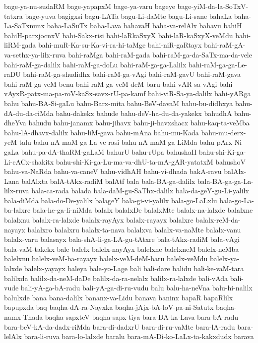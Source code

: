 {bage-ya-nu-sudaRM
bage-yapapxM
bage-ya-varu
bageye
bage-yiM-da-la-SoTxV-tatxra
bage-yuva
bagigxsi
bagu-LATa
bagu-Li-daMte
bagu-Li-sane
bahaLa
baha-La-SaTxnunx
baha-LaSuTx
baha-Lava
bahavaH
baha-va-relAlx
bahavu
bahiH
bahiH-parxjocnxV
bahi-Sakx-risi
bahi-laRkaSxyX
bahi-laR-kaSxyX-veMdu
bahi-liRM-gada
bahi-muR-Ka-su-Ka-vi-ra-hi-taMge
bahi-niR-gaRtayx
bahi-raM-gA-va-sethx-ya-lilx-ruva
bahi-raMga
bahi-raM-gada
bahi-raM-ga-da-SaTx-ma-da-vele
bahi-raM-ga-dalilx
bahi-raM-ga-doLu
bahi-raM-ga-ga-Lalilx
bahi-raM-ga-ga-Le-raDU
bahi-raM-ga-shudidhx
bahi-raM-ga-vAgi
bahi-raM-gavU
bahi-raM-gava
bahi-raM-ga-veM-benu
bahi-raM-ga-veM-deM-baru
bahi-vAR-sa-vAgi
bahi-vAyxR-patx-ma-pa-roV-kaSx-savx-rU-pa-kamf
bahi-viR-Sa-ya-dalilx
bahi-yARga
bahu
bahu-BA-Si-gaLu
bahu-Barx-mita
bahu-BeV-davaM
bahu-bu-didhxya
bahu-dA-du-da-riMda
bahu-dakekx
bahude
bahu-deV-ha-du-da-yakekx
bahudhA
bahu-dheYva
bahudu
bahu-janamx
bahu-jihavx
bahu-ji-havxshacx
bahu-kaq-ta-veMba
bahu-lA-dhavx-dalilx
bahu-liM-gava
bahu-mAna
bahu-mu-Kada
bahu-mu-derx-yeM-talu
bahu-nA-maM-ga-La-ve-rasi
bahu-nA-maM-ga-LiMda
bahu-pArx-Ni-gaLa
bahu-pa-dA-thaRM-gaLaM
bahurU
bahu-rUpa
bahushaH
bahu-shi-Ki-ga-Li-cACx-shakitx
bahu-shi-Ki-ga-Lu-ma-va-dhU-ta-mA-gAR-yatatxM
bahushoV
bahu-va-NaRda
bahu-va-caneV
bahu-vidhAH
bahu-vi-dhada
bakA-ravu
balAlx-Lana
balAlxta
balA-tAkx-radiM
balAtf
bala
bala-BA-ga-dalilx
bala-BA-ga-ga-La-lilx-ruva
bala-ca-rada
balada
bala-daM-gu-SaThx-dalilx
bala-da-geY-gu-Li-yalilx
bala-diMda
bala-do-De-yalilx
balageY
bala-gi-vi-yalilx
bala-go-LaLxlu
bala-go-La-ba-lalxre
bala-he-ga-li-niMda
balalx
balalxDe
balalxMte
balalx-na-lalxde
balalxne
balalxnu
balalx-ra-lalxde
balalx-rayAyx
balalx-rayayx
balalxre
balalx-reM-da-nayayx
balalxro
balalxru
balalx-ta-nava
balalxva
balalx-va-naMte
balalx-vanu
balalx-varu
balasayx
bala-shA-li-ga-LA-gu-tAtxre
bala-tAkx-radiM
bala-vAgi
bala-vaM-takekx
bale
balelx
balelx-nayAyx
balelxne
balelxneM
balelx-neMba
balelxnu
balelx-veM-ba-rayayx
balelx-veM-deM-baru
balelx-veMdu
balelx-ya-lalxde
balelx-yayayx
baleya
bale-yo-Lage
bali
bali-dare
balidu
bali-ke-vaM-tara
balilxda
balilx-da-neM-daDe
balilx-da-ra-nelalx
balilx-ra-lalxde
bali-vAda
bali-vude
bali-yA-ga-bA-radu
bali-yA-ga-di-ru-vudu
balu
balu-ha-neVna
balu-hi-nalilx
balulxde
bana
bana-dalilx
bananx-va-Lidu
banava
baninx
bapaR
bapaRlilx
bapupxda
baq
baqha-dA-ra-Nayxka
baqha-jAjx-bA-loV-pa-ni-Satutx
baqha-namx-Thada
baqha-sapxteV
baqha-sapx-tiya
bara-DA-ka-Lava
bara-bA-radu
bara-beV-kA-da-dadx-riMda
bara-di-dadxrU
bara-di-ru-vaMte
bara-lA-radu
bara-lelAlx
bara-li-ruva
bara-lo-lalxde
baralu
bara-mA-Di-ko-LaLx-ta-kakxdudx
barava
}

